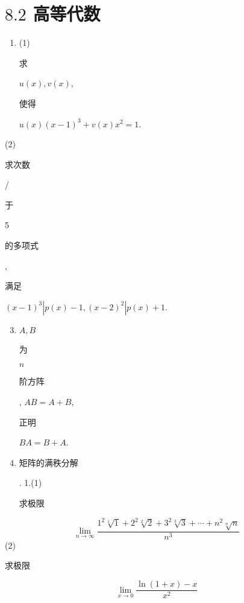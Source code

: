 \documentclass[10pt]{article}
\begin{document}
\section{$8.2$ 高等代数}
\begin{enumerate}
  \item (1) \begin{CJK}{UTF8}{mj}求\end{CJK} $u(x), v(x)$, \begin{CJK}{UTF8}{mj}使得\end{CJK} $u(x)(x-1)^{3}+v(x) x^{2}=1$.
\end{enumerate}
(2) \begin{CJK}{UTF8}{mj}求次数\end{CJK}/\begin{CJK}{UTF8}{mj}于\end{CJK} 5 \begin{CJK}{UTF8}{mj}的多项式\end{CJK}, \begin{CJK}{UTF8}{mj}满足\end{CJK} $(x-1)^{3}\left|p(x)-1,(x-2)^{2}\right| p(x)+1$.

\begin{enumerate}
  \setcounter{enumi}{2}
  \item $A, B$ \begin{CJK}{UTF8}{mj}为\end{CJK} $n$ \begin{CJK}{UTF8}{mj}阶方阵\end{CJK}, $A B=A+B$, \begin{CJK}{UTF8}{mj}正明\end{CJK} $B A=B+A$.

  \item \begin{CJK}{UTF8}{mj}矩阵的满秩分解\end{CJK}. 1.(1)\begin{CJK}{UTF8}{mj}求极限\end{CJK}

\end{enumerate}
$$
\lim _{n \rightarrow \infty} \frac{1^{2} \sqrt[1]{1}+2^{2} \sqrt[2]{2}+3^{2} \sqrt[3]{3}+\cdots+n^{2} \sqrt[n]{n}}{n^{3}}
$$
(2) \begin{CJK}{UTF8}{mj}求极限\end{CJK}
$$
\lim _{x \rightarrow 0} \frac{\ln (1+x)-x}{x^{2}}
$$
\end{document}
